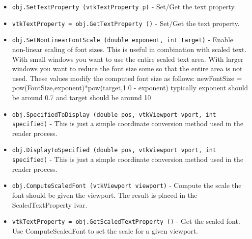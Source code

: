 \begin{itemize}
\item  \verb|obj.SetTextProperty (vtkTextProperty p)| -  Set/Get the text property.

\item  \verb|vtkTextProperty = obj.GetTextProperty ()| -  Set/Get the text property.

\item  \verb|obj.SetNonLinearFontScale (double exponent, int target)| -  Enable non-linear scaling of font sizes. This is useful in combination
 with scaled text. With small windows you want to use the entire scaled
 text area. With larger windows you want to reduce the font size some so
 that the entire area is not used. These values modify the computed font 
 size as follows:  
   newFontSize = pow(FontSize,exponent)*pow(target,1.0 - exponent)
 typically exponent should be around 0.7 and target should be around 10

\item  \verb|obj.SpecifiedToDisplay (double pos, vtkViewport vport, int specified)| -  This is just a simple coordinate conversion method used in the render
 process.

\item  \verb|obj.DisplayToSpecified (double pos, vtkViewport vport, int specified)| -  This is just a simple coordinate conversion method used in the render
 process.

\item  \verb|obj.ComputeScaledFont (vtkViewport viewport)| -  Compute the scale the font should be given the viewport.  The result
 is placed in the ScaledTextProperty ivar.

\item  \verb|vtkTextProperty = obj.GetScaledTextProperty ()| -  Get the scaled font.  Use ComputeScaledFont to set the scale for a given
 viewport.

\end{itemize}
